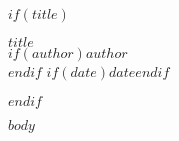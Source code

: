 \documentclass[answers, addpoints]{exam}
\begin{document}
$if(title)$
\begin{center}
\textbf{\Large $title$}\\[0.5em]
$if(author)$\textit{$author$}\\[0.3em]$endif$
$if(date)$$date$$endif$
\end{center}
\vspace{1em}
$endif$

$body$
\end{document}

